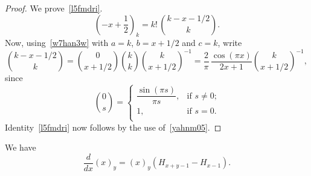 \documentclass[12pt,reqno]{article}
\begin{document}
\begin{proof}
We prove~\eqref{l5fmdri}.
\begin{equation}
\left( { - x + \frac{1}{2}} \right)_k  = k!\,\binom{{k - x - 1/2}}{k}.
\end{equation}
Now, using~\eqref{w7han3w} with $a=k$, $b=x+1/2$ and $c=k$, write
\begin{equation}
\binom{{k - x - 1/2}}{k} = \binom{{0}}{{x + 1/2}}\binom{{k}}{k}\binom{{k}}{{x + 1/2}}^{ - 1}  = \frac{2}{\pi }\,\frac{{\cos \left( \pi x\right)}}{{2x + 1}}\binom{{k}}{{x + 1/2}}^{ - 1},
\end{equation}
since
\begin{equation}
\binom{{0}}{s}
=\begin{cases}
 \dfrac{{\sin \left( {\pi s} \right)}}{{\pi s}},&\text{if $s\ne0$;} \\ 
 1,&\text{if $s=0$.} \\ 
 \end{cases}
\end{equation}
Identity~\eqref{l5fmdri} now follows by the use of~\eqref{yahnm05}.
\end{proof}
\begin{lemma}
We have
\begin{equation}
\frac{d}{{dx}}\left( x \right)_y  = \left( x \right)_y \left( {H_{x + y - 1}  - H_{x - 1} } \right).
\end{equation}
\end{lemma}
\end{document}
